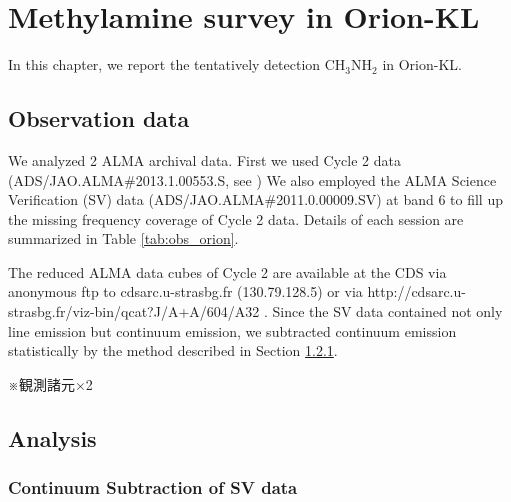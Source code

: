 \chapter{Methylamine survey in Orion-KL
\label{chap:Orion-KL}}

In this chapter, we report the tentatively detection CH$_{3}$NH$_{2}$ in Orion-KL.

\section{Observation data}
We analyzed 2 ALMA archival data. First we used Cycle 2 data (ADS/JAO.ALMA\#2013.1.00553.S, 
see \cite{Pagani+2017}) 
We also employed the ALMA Science Verification (SV) data (ADS/JAO.ALMA\#2011.0.00009.SV) 
at band 6 to fill up the missing frequency coverage of Cycle 2 data. 
Details of each session are summarized in Table \ref{tab:obs_orion}.

The reduced ALMA data cubes of Cycle 2 are available at
the CDS via anonymous ftp to cdsarc.u-strasbg.fr (130.79.128.5) or via
http://cdsarc.u-strasbg.fr/viz-bin/qcat?J/A+A/604/A32 .
Since the SV data contained not only line emission but continuum emission, 
we subtracted continuum emission statistically by the method described in Section \ref{sec:Statcont}.

※観測諸元$\times$2

\section{Analysis}
\subsection{Continuum Subtraction of SV data}
\label{sec:Statcont}

